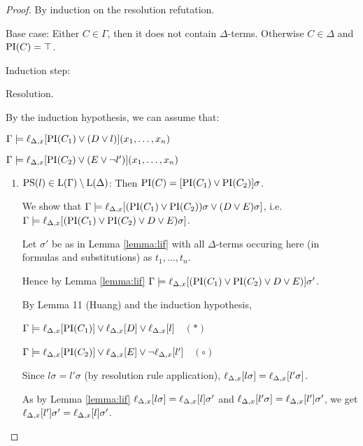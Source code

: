 \documentclass[,%
	paper=a4,%
	DIV14, 
	liststotoc,
	bibtotoc,
	draft=false,%
	numbers=noendperiod
]{scrartcl}
\newcommand{\lif}[1]{\lift{\Delta}{#1}{x}}
\begin{document}
\begin{proof}
	By induction on the resolution refutation.

	Base case:
	Either $C \in \Gamma$, then it does not contain $\Delta$-terms.
	Otherwise $C \in \Delta$ and $\operatorname{PI}(C) = \top$.

	Induction step:
	\begin{description}
		\item{Resolution.}
			\begin{prooftree}
			\end{prooftree}

			By the induction hypothesis, we can assume that:

			$\Gamma \entails \lif{\PI(C_1) \lor (D\lor l)}(x_1, \ldots, x_n)$

			$\Gamma \entails \lif{\PI(C_2) \lor (E\lor \lnot l')}(x_{1}, \ldots, x_n)$

			\begin{enumerate}
				\item $\operatorname{PS}(l) \in \operatorname{L}(\Gamma) \setminus \operatorname{L}(\Delta)$:
					Then $\operatorname{PI}(C) = [\operatorname{PI}(C_1) \lor \operatorname{PI}(C_2)]\sigma$. 

					We show that $\Gamma \entails \lif{ (\PI(C_1) \lor \PI(C_2))\sigma \lor (D \lor E)\sigma}$,
					\newline 
					i.e.~$\Gamma \entails \lif{ (\PI(C_1) \lor \PI(C_2) \lor D \lor E)\sigma} $.

					Let $\sigma'$ be as in Lemma \ref{lemma:lif} with all $\Delta$-terms occuring here (in formulas and substitutions) as $t_1, \ldots, t_n$.

					Hence by Lemma \ref{lemma:lif}
					$\Gamma \entails \lif{(\PI(C_1) \lor \PI(C_2) \lor D \lor E)}\sigma' $.

					By Lemma 11 (Huang) and the induction hypothesis,

					$\Gamma \entails \lif{\PI(C_1)} \lor \lif{D} \lor \lif l$ $\;\;(*)$

					$\Gamma \entails \lif{\PI(C_2)} \lor \lif{E} \lor \lnot \lif{l'}$ $\;\;(\circ)$


					Since $l\sigma = l'\sigma$ (by resolution rule application), $\lif{l\sigma} = \lif{l'\sigma}$.
					
					As by Lemma \ref{lemma:lif} $\lif{l\sigma} = \lif{l}\sigma'$ and $\lif{l'\sigma} = \lif{l'}\sigma'$,
					we get $\lif{l'}\sigma' = \lif{l}\sigma'$.


\end{enumerate}
\end{description}
\end{proof}
\end{document}
